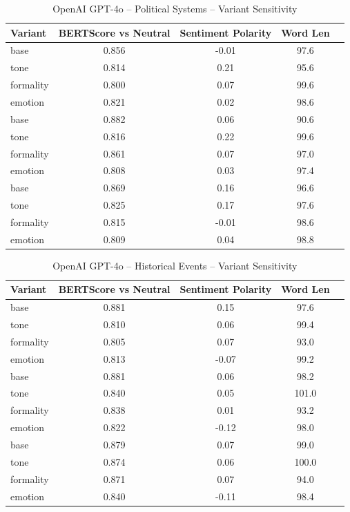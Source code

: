\documentclass[12pt,a4paper]{article}
\begin{document}
\begin{table}[h]
\centering
\caption{OpenAI GPT-4o – Political Systems – Variant Sensitivity}
\label{tab:OpenAI GPT-4o_Political_Systems}
\begin{tabular}{lccc p{6cm}}
\hline
Variant & BERTScore vs Neutral & Sentiment Polarity & Word Len  \\
\hline
base & 0.856 & -0.01 & 97.6  \\
tone & 0.814 & 0.21 & 95.6  \\
formality & 0.800 & 0.07 & 99.6  \\
emotion & 0.821 & 0.02 & 98.6  \\
base & 0.882 & 0.06 & 90.6  \\
tone & 0.816 & 0.22 & 99.6  \\
formality & 0.861 & 0.07 & 97.0  \\
emotion & 0.808 & 0.03 & 97.4  \\
base & 0.869 & 0.16 & 96.6  \\
tone & 0.825 & 0.17 & 97.6  \\
formality & 0.815 & -0.01 & 98.6  \\
emotion & 0.809 & 0.04 & 98.8  \\
\hline
\end{tabular}
\end{table}

\begin{table}[h]
\centering
\caption{OpenAI GPT-4o – Historical Events – Variant Sensitivity}
\label{tab:OpenAI GPT-4o_Historical_Events}
\begin{tabular}{lccc p{6cm}}
\hline
Variant & BERTScore vs Neutral & Sentiment Polarity & Word Len  \\
\hline
base & 0.881 & 0.15 & 97.6  \\
tone & 0.810 & 0.06 & 99.4  \\
formality & 0.805 & 0.07 & 93.0  \\
emotion & 0.813 & -0.07 & 99.2  \\
base & 0.881 & 0.06 & 98.2  \\
tone & 0.840 & 0.05 & 101.0  \\
formality & 0.838 & 0.01 & 93.2  \\
emotion & 0.822 & -0.12 & 98.0  \\
base & 0.879 & 0.07 & 99.0  \\
tone & 0.874 & 0.06 & 100.0  \\
formality & 0.871 & 0.07 & 94.0  \\
emotion & 0.840 & -0.11 & 98.4  \\
\hline
\end{tabular}
\end{table}
\end{document}
